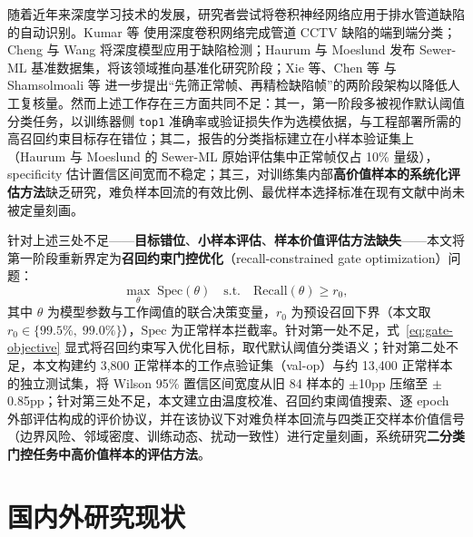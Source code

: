 \documentclass[UTF8,openany,12pt]{ctexbook}
\newcommand{\formalmetric}[1]{\texttt{#1}}
\begin{document}
随着近年来深度学习技术的发展，研究者尝试将卷积神经网络应用于排水管道缺陷的自动识别。Kumar 等\cite{kumar2018cnn} 使用深度卷积网络完成管道 CCTV 缺陷的端到端分类；Cheng 与 Wang\cite{cheng2018deep} 将深度模型应用于缺陷检测；Haurum 与 Moeslund\cite{haurum2021sewerml} 发布 Sewer-ML 基准数据集，将该领域推向基准化研究阶段；Xie 等\cite{xie2019hierarchical}、Chen 等\cite{chen2018intelligent} 与 Shamsolmoali 等\cite{shamsolmoali2025twostage} 进一步提出``先筛正常帧、再精检缺陷帧''的两阶段架构以降低人工复核量。然而上述工作存在三方面共同不足：其一，第一阶段多被视作默认阈值分类任务，以训练器侧 \formalmetric{top1} 准确率或验证损失作为选模依据\cite{kumar2018cnn,haurum2021sewerml}，与工程部署所需的高召回约束目标存在错位；其二，报告的分类指标建立在小样本验证集上（Haurum 与 Moeslund\cite{haurum2021sewerml} 的 Sewer-ML 原始评估集中正常帧仅占 10\% 量级），specificity 估计置信区间宽而不稳定；其三，对训练集内部\textbf{高价值样本的系统化评估方法}缺乏研究，难负样本回流的有效比例、最优样本选择标准在现有文献中尚未被定量刻画。

针对上述三处不足——\textbf{目标错位}、\textbf{小样本评估}、\textbf{样本价值评估方法缺失}——本文将第一阶段重新界定为\textbf{召回约束门控优化}（recall-constrained gate optimization）问题：
\begin{equation}
\max_{\theta}\;\mathrm{Spec}(\theta) \quad \text{s.t.} \quad \mathrm{Recall}(\theta) \geq r_0,
\label{eq:gate-objective}
\end{equation}
其中 $\theta$ 为模型参数与工作阈值的联合决策变量，$r_0$ 为预设召回下界（本文取 $r_0 \in \{99.5\%,\;99.0\%\}$），$\mathrm{Spec}$ 为正常样本拦截率。针对第一处不足，式~\eqref{eq:gate-objective} 显式将召回约束写入优化目标，取代默认阈值分类语义；针对第二处不足，本文构建约 3{,}800 正常样本的工作点验证集（val-op）与约 13{,}400 正常样本的独立测试集，将 Wilson 95\% 置信区间宽度从旧 84 样本的 $\pm$10pp 压缩至 $\pm$0.85pp；针对第三处不足，本文建立由温度校准\cite{guo2017calibration}、召回约束阈值搜索\cite{elkan2001foundations,kumar2021constrained}、逐 epoch 外部评估构成的评价协议，并在该协议下对难负样本回流与四类正交样本价值信号（边界风险、邻域密度、训练动态、扰动一致性）进行定量刻画，系统研究\textbf{二分类门控任务中高价值样本的评估方法}。

\section{国内外研究现状}
\end{document}
